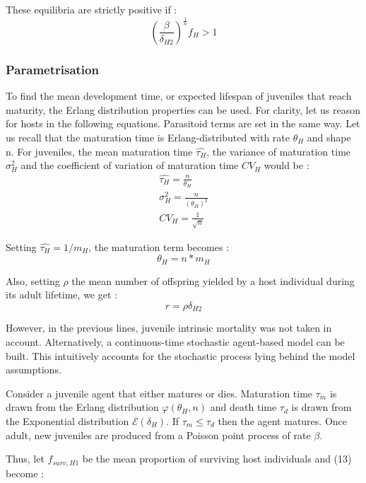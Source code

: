 \documentclass[12pt,a4paper,onecolumn]{article}
\begin{document}
These equilibria are strictly positive if :
\begin{equation}
(\frac{\beta}{\delta_{H2}})^{\frac{1}{n}} f_H  > 1
\end{equation}

\subsubsection{Parametrisation}
To find the mean development time, or expected lifespan of juveniles that reach maturity, the Erlang distribution properties can be used.
For clarity, let us reason for hosts in the following equations. Parasitoid terms are set in the same way.  Let us recall that the maturation time is Erlang-distributed with rate $\theta_H$ and shape n. For juveniles, the mean maturation time $\hat{\tau_{H}}$, the variance of maturation time $\sigma^2_{H}$ and the coefficient of variation of maturation time $CV_{H}$ would be : 
\begin{align}
\hat{\tau_{H}} = \frac{n}{\theta_{H}} \nonumber \\
\sigma^2_{H} = \frac{n}{(\theta_{H})^2} \\
CV_{H} = \frac{1}{\sqrt{n}} \nonumber 
\end{align}

Setting  $\hat{\tau_{H}} = 1/m_H$, the maturation term becomes :
\begin{equation}
\theta_H = n*m_H
\end{equation}

Also, setting $\rho$ the mean number of offspring yielded by a host individual during its adult lifetime, we get :
\begin{equation}
r = \rho \delta_{H2}
\end{equation}

However, in the previous lines, juvenile intrinsic mortality was not taken in account. Alternatively, a continuous-time stochastic agent-based model can be built. This intuitively accounts for the stochastic process lying behind the model assumptions.

Consider a juvenile agent that either matures or dies. Maturation time $\tau_m$ is drawn from the Erlang distribution $\varphi(\theta_H, n)$ and death time $\tau_d$ is drawn from the Exponential distribution $\mathcal{E}(\delta_H)$. If $\tau_m \leq \tau_d$ then the agent matures. Once adult, new juveniles are produced from a Poisson point process of rate $\beta$.

Thus, let $f_{surv,H1}$ be the mean proportion of surviving host individuals and (13) become :
\end{document}
